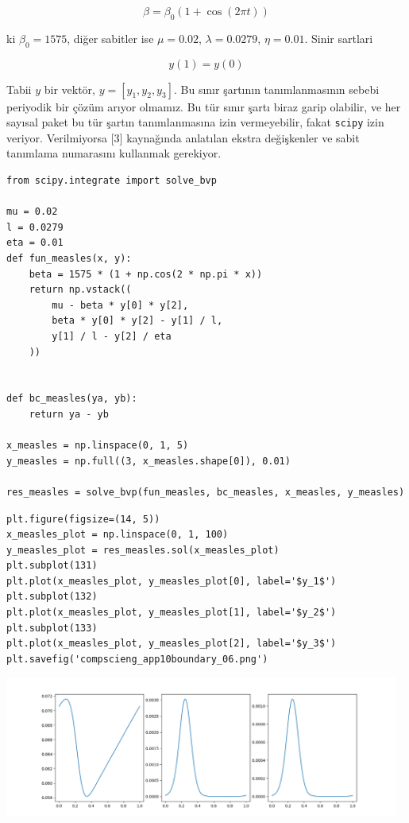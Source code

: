 \documentclass[12pt,fleqn]{article}\usepackage{../../common}
\begin{document}
$$
\beta = \beta_0 (1 + \cos(2 \pi t))
$$

ki $\beta_0 = 1575$, diğer sabitler ise $\mu = 0.02$, $\lambda = 0.0279$,
$\eta = 0.01$. Sinir sartlari 

$$
y(1) = y(0)
$$

Tabii $y$ bir vektör, $y = [y_1,y_2,y_3]$. Bu sınır şartının
tanımlanmasının sebebi periyodik bir çözüm arıyor olmamız. Bu tür sınır
şartı biraz garip olabilir, ve her sayısal paket bu tür şartın
tanımlanmasına izin vermeyebilir, fakat \verb!scipy! izin
veriyor. Verilmiyorsa [3] kaynağında anlatılan ekstra değişkenler ve sabit
tanımlama numarasını kullanmak gerekiyor.

\begin{verbatim}
from scipy.integrate import solve_bvp

mu = 0.02
l = 0.0279
eta = 0.01
def fun_measles(x, y):
    beta = 1575 * (1 + np.cos(2 * np.pi * x))
    return np.vstack((
        mu - beta * y[0] * y[2],
        beta * y[0] * y[2] - y[1] / l,
        y[1] / l - y[2] / eta
    ))


def bc_measles(ya, yb):
    return ya - yb

x_measles = np.linspace(0, 1, 5)
y_measles = np.full((3, x_measles.shape[0]), 0.01)

res_measles = solve_bvp(fun_measles, bc_measles, x_measles, y_measles)
\end{verbatim}

\begin{verbatim}
plt.figure(figsize=(14, 5))
x_measles_plot = np.linspace(0, 1, 100)
y_measles_plot = res_measles.sol(x_measles_plot)
plt.subplot(131)
plt.plot(x_measles_plot, y_measles_plot[0], label='$y_1$')
plt.subplot(132)
plt.plot(x_measles_plot, y_measles_plot[1], label='$y_2$')
plt.subplot(133)
plt.plot(x_measles_plot, y_measles_plot[2], label='$y_3$')
plt.savefig('compscieng_app10boundary_06.png')
\end{verbatim}

\includegraphics[width=35em]{compscieng_app10boundary_06.png}
\end{document}
